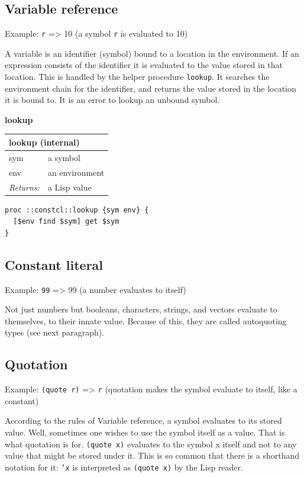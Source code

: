 \documentclass[twoside,9pt]{report}
\begin{document}
\subsection{Variable reference}
\label{variable-reference}

Example: \texttt{r} => 10 (a symbol \texttt{r} is evaluated to 10)


A variable is an identifier (symbol) bound to a location in the environment. If an expression consists of the identifier it is evaluated to the value stored in that location. This is handled by the helper procedure \texttt{lookup}. It searches the environment chain for the identifier, and returns the value stored in the location it is bound to. It is an error to lookup an unbound symbol.


\textbf{lookup}

\begin{tabular}{ |l l| }
\hline
\multicolumn{2}{|l|}{lookup (internal)} \\
\hline
sym & a symbol \\
env & an environment \\
\textit{Returns:} & a Lisp value \\
\hline
\end{tabular}

\noindent\makebox[\linewidth]{\rule{\linewidth}{0.4pt}}
\begin{lstlisting}
proc ::constcl::lookup {sym env} {
  [$env find $sym] get $sym
}
\end{lstlisting}
\noindent\makebox[\linewidth]{\rule{\linewidth}{0.4pt}}
\subsection{Constant literal}
\label{constant-literal}

Example: \texttt{99} => 99 (a number evaluates to itself)


Not just numbers but booleans, characters, strings, and vectors evaluate to themselves, to their innate value. Because of this, they are called autoquoting types (see next paragraph).

\subsection{Quotation}
\label{quotation}

Example: \texttt{(quote r)} => \texttt{r} (quotation makes the symbol evaluate to itself, like a constant)


According to the rules of Variable reference, a symbol evaluates to its stored value. Well, sometimes one wishes to use the symbol itself as a value. That is what quotation is for. \texttt{(quote x)} evaluates to the symbol x itself and not to any value that might be stored under it. This is so common that there is a shorthand notation for it: \texttt{'x} is interpreted as \texttt{(quote x)} by the Lisp reader.
\end{document}
